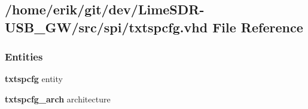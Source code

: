 \subsection{/home/erik/git/dev/\+Lime\+S\+D\+R-\/\+U\+S\+B\+\_\+\+G\+W/src/spi/txtspcfg.vhd File Reference}
\label{txtspcfg_8vhd}
\subsubsection*{Entities}
\begin{DoxyCompactItemize}
\item 
{\bf txtspcfg} entity
\item 
{\bf txtspcfg\+\_\+arch} architecture
\end{DoxyCompactItemize}
